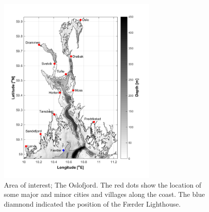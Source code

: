 \begin{figure}[htb]
\centerline{
\includegraphics*[trim=0cm 0.9cm 0cm 0cm,clip=true,width=0.7\textwidth]{Figurer/kart}
}
\caption{\small
Area of interest; The Oslofjord. The red dots show the location of some major and minor cities and villages along the coast. The blue diamnond indicated the position of the F{\ae}rder Lighthouse.
}
\label{fig:kart}
\end{figure}

\clearpage

